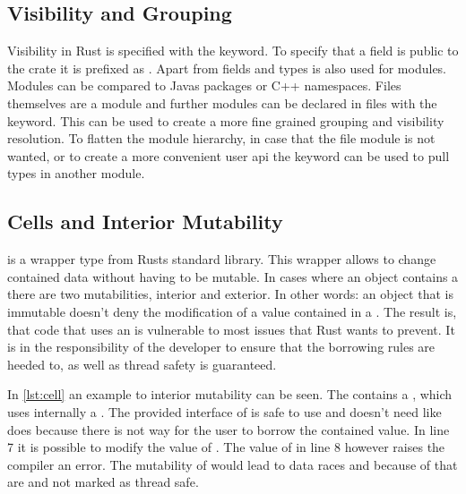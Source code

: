 \documentclass[thesis]{subfiles}
\begin{document}
  \subsection{Visibility and Grouping}
    Visibility in Rust is specified with the \pub keyword.
    To specify that a field is public to the crate it is prefixed as .
    Apart from fields and types \pub is also used for modules.
    Modules can be compared to Javas packages or C++ namespaces.
    Files themselves are a module and further modules can be declared in files with the \mod keyword.
    This can be used to create a more fine grained grouping and visibility resolution.
    To flatten the module hierarchy, in case that the file module is not wanted, or to create a more convenient user \gls{api} the \use keyword can be used to pull types in another module.
    \autocite[Visibility and Privacy, Use declarations]{rust-ref}

  \subsection{Cells and Interior Mutability}\label{sec:cell}
    \UnsafeCellT is a wrapper type from Rusts standard library.
    This wrapper allows to change contained data without having to be mutable.
    In cases where an object contains a \UnsafeCellT there are two mutabilities, interior and exterior.
    In other words: an object that is immutable doesn't deny the modification of a value contained in a \UnsafeCellT.
    The result is, that code that uses an \UnsafeCellT is vulnerable to most issues that Rust wants to prevent.
    It is in the responsibility of the developer to ensure that the borrowing rules are heeded to, as well as thread safety is guaranteed.\autocite[std::cell]{rust-doc}


    In \autoref{lst:cell} an example to interior mutability can be seen.
    The \struct \Foo contains a \CellT, which uses internally a \UnsafeCellT.
    The provided interface of \CellT is safe to use and doesn't need \unsafe like \UnsafeCellT does because there is not way for the user to borrow the contained value.
    In line 7 it is possible to modify the value of \x.
    The value of \y in line 8 however raises the compiler an error.
    The mutability of \x would lead to data races and because of that are \CellT and \RefCellT not marked as thread safe\autocites[std::cell]{rust-doc}[Send and Sync]{rust-nom}.
\end{document}
